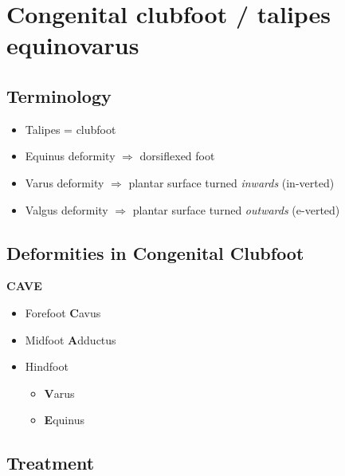 \documentclass[
  14pt,
]{memoir}
\providecommand{\tightlist}{%
  \setlength{\itemsep}{0pt}\setlength{\parskip}{0pt}}
\begin{document}
\pagebreak

\hypertarget{congenital-clubfoot-talipes-equinovarus}{%
\section{Congenital clubfoot / talipes
equinovarus}\label{congenital-clubfoot-talipes-equinovarus}}

\hypertarget{terminology}{%
\subsection{Terminology}\label{terminology}}

\begin{itemize}
\tightlist
\item
  Talipes = clubfoot
\item
  Equinus deformity \(\Rightarrow\) dorsiflexed foot
\item
  Varus deformity \(\Rightarrow\) plantar surface turned \emph{inwards}
  (in-verted)
\item
  Valgus deformity \(\Rightarrow\) plantar surface turned
  \emph{outwards} (e-verted)
\end{itemize}

\hypertarget{deformities-in-congenital-clubfoot}{%
\subsection{Deformities in Congenital
Clubfoot}\label{deformities-in-congenital-clubfoot}}

\textbf{CAVE}

\begin{itemize}
\tightlist
\item
  Forefoot \textbf{C}avus
\item
  Midfoot \textbf{A}dductus
\item
  Hindfoot

  \begin{itemize}
  \tightlist
  \item
    \textbf{V}arus
  \item
    \textbf{E}quinus
  \end{itemize}
\end{itemize}

\hypertarget{treatment-1}{%
\subsection{Treatment}\label{treatment-1}}
\end{document}
